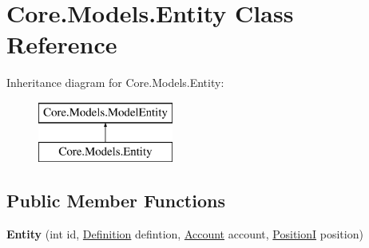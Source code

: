 \hypertarget{classCore_1_1Models_1_1Entity}{\section{Core.\-Models.\-Entity Class Reference}
\label{classCore_1_1Models_1_1Entity}
}
Inheritance diagram for Core.\-Models.\-Entity\-:\begin{figure}[H]
\begin{center}
\leavevmode
\includegraphics[height=2.000000cm]{classCore_1_1Models_1_1Entity}
\end{center}
\end{figure}
\subsection*{Public Member Functions}
\begin{DoxyCompactItemize}
\item 
\hypertarget{classCore_1_1Models_1_1Entity_a09638044f7fdf3b431c5144e58e53112}{{\bfseries Entity} (int id, \hyperlink{classCore_1_1Models_1_1Definitions_1_1Definition}{Definition} defintion, \hyperlink{classCore_1_1Models_1_1Account}{Account} account, \hyperlink{classCore_1_1Models_1_1PositionI}{Position\-I} position)}\label{classCore_1_1Models_1_1Entity_a09638044f7fdf3b431c5144e58e53112}

\end{DoxyCompactItemize}

